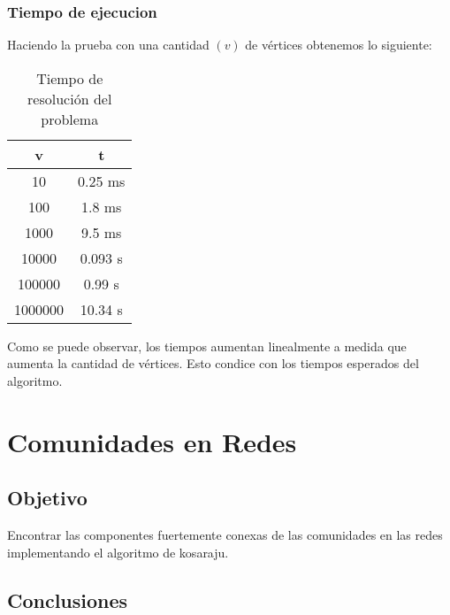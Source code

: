 \documentclass{article}
\begin{document}
            \subsubsection{Tiempo de ejecucion}
                Haciendo la prueba con una cantidad $(v)$ de vértices obtenemos lo siguiente:
                \begin{table}[h]
                    \centering
                    \caption{Tiempo de resolución del problema}
                    \begin{tabular}{c|c}
                        v & t \\
                        \hline
                        10 & 0.25 ms \\
                        \hline
                        100 & 1.8 ms \\
                        \hline
                        1000 & 9.5 ms \\
                        \hline
                        10000 & 0.093 s \\
                        \hline
                        100000 & 0.99 s \\
                        \hline
                        1000000 & 10.34 s
                    \end{tabular}
                \end{table}

                Como se puede observar, los tiempos aumentan linealmente a medida
                que aumenta la cantidad de vértices. Esto condice con los tiempos
                esperados del algoritmo.


    \section{Comunidades en Redes}
        \subsection{Objetivo}
          Encontrar las componentes fuertemente conexas de las comunidades en las
          redes implementando el algoritmo de kosaraju.
        \subsection{Conclusiones}
\end{document}

